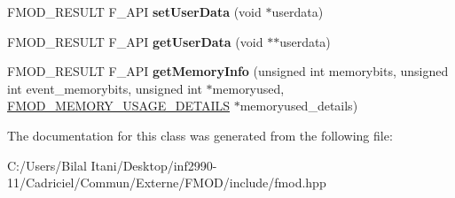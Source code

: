 \begin{DoxyCompactItemize}
\item 
F\+M\+O\+D\+\_\+\+R\+E\+S\+U\+LT F\+\_\+\+A\+PI {\bfseries set\+User\+Data} (void $\ast$userdata)\hypertarget{class_f_m_o_d_1_1_channel_a1ffb34925720c2fcc0afbcab0737df4e}{}\label{class_f_m_o_d_1_1_channel_a1ffb34925720c2fcc0afbcab0737df4e}

\item 
F\+M\+O\+D\+\_\+\+R\+E\+S\+U\+LT F\+\_\+\+A\+PI {\bfseries get\+User\+Data} (void $\ast$$\ast$userdata)\hypertarget{class_f_m_o_d_1_1_channel_ab22d259b47802604e61c0e412d7e35f4}{}\label{class_f_m_o_d_1_1_channel_ab22d259b47802604e61c0e412d7e35f4}

\item 
F\+M\+O\+D\+\_\+\+R\+E\+S\+U\+LT F\+\_\+\+A\+PI {\bfseries get\+Memory\+Info} (unsigned int memorybits, unsigned int event\+\_\+memorybits, unsigned int $\ast$memoryused, \hyperlink{struct_f_m_o_d___m_e_m_o_r_y___u_s_a_g_e___d_e_t_a_i_l_s}{F\+M\+O\+D\+\_\+\+M\+E\+M\+O\+R\+Y\+\_\+\+U\+S\+A\+G\+E\+\_\+\+D\+E\+T\+A\+I\+LS} $\ast$memoryused\+\_\+details)\hypertarget{class_f_m_o_d_1_1_channel_acefe95cb3e5096a5f01f253c2745bad3}{}\label{class_f_m_o_d_1_1_channel_acefe95cb3e5096a5f01f253c2745bad3}

\end{DoxyCompactItemize}


The documentation for this class was generated from the following file\+:\begin{DoxyCompactItemize}
\item 
C\+:/\+Users/\+Bilal Itani/\+Desktop/inf2990-\/11/\+Cadriciel/\+Commun/\+Externe/\+F\+M\+O\+D/include/fmod.\+hpp\end{DoxyCompactItemize}
